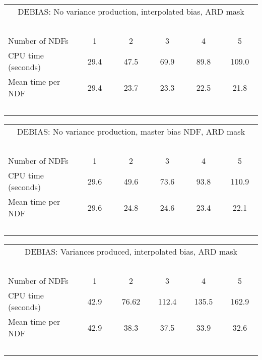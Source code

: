 \begin{center}
   \begin{tabular}{|l||c|c|c|c|c|}
   \multicolumn{6}{c}{DEBIAS: No variance production, interpolated bias,
   ARD mask} \\
   \multicolumn{6}{l}{~~~}
   \\ \hline
   Number of NDFs    & ~~~1~~~ & ~~~2~~~ & ~~~3~~~ & ~~~4~~~ & ~~~5~~~
    \\ \hline
   CPU time (seconds)& 29.4    & 47.5    & 69.9    & 89.8    & 109.0
    \\ \hline
   Mean time per NDF & 29.4    & 23.7    & 23.3    & 22.5    & 21.8
    \\ \hline
   \multicolumn{6}{l}{~~~}
   \\ 
   \end{tabular}

   \begin{tabular}{|l||c|c|c|c|c|}
   \multicolumn{6}{c}{DEBIAS: No variance production, master bias NDF,
   ARD mask} \\
   \multicolumn{6}{l}{~~~}
   \\ \hline
   Number of NDFs    & ~~~1~~~ & ~~~2~~~ & ~~~3~~~ & ~~~4~~~ & ~~~5~~~
    \\ \hline
   CPU time (seconds)& 29.6    & 49.6    & 73.6    & 93.8    & 110.9
    \\ \hline
   Mean time per NDF & 29.6    & 24.8    & 24.6    & 23.4    & 22.1
    \\ \hline
   \multicolumn{6}{l}{~~~}
   \\ 
   \end{tabular}

   \begin{tabular}{|l||c|c|c|c|c|}
   \multicolumn{6}{c}{DEBIAS: Variances produced, interpolated bias,
   ARD mask} \\
   \multicolumn{6}{l}{~~~}
   \\ \hline
   Number of NDFs    & ~~~1~~~ & ~~~2~~~ & ~~~3~~~ & ~~~4~~~ & ~~~5~~~
    \\ \hline
   CPU time (seconds)& 42.9    & 76.62    & 112.4    & 135.5    & 162.9
    \\ \hline
   Mean time per NDF & 42.9    & 38.3    & 37.5    & 33.9    & 32.6
    \\ \hline
   \multicolumn{6}{l}{~~~}
   \\
   \end{tabular}


\end{center}

